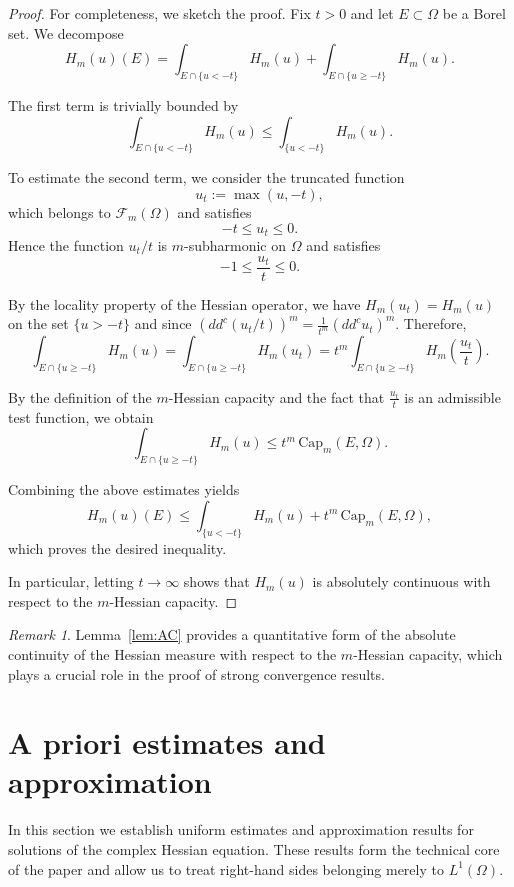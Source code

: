 \documentclass[11pt,reqno]{amsart}
\theoremstyle{definition}
\theoremstyle{remark}
\newtheorem{remark}[theorem]{Remark}
\newcommand{\ddc}{dd^c}
\begin{document}
	\begin{proof}
For completeness, we sketch the proof.
		Fix $t>0$ and let $E\subset\Omega$ be a Borel set.
		We decompose
		\[
		H_m(u)(E)
		=
		\int_{E\cap\{u<-t\}} H_m(u)
		+
		\int_{E\cap\{u\ge -t\}} H_m(u).
		\]
		
		The first term is trivially bounded by
		\[
		\int_{E\cap\{u<-t\}} H_m(u)
		\le
		\int_{\{u<-t\}} H_m(u).
		\]
		
		To estimate the second term, we consider the truncated function
		\[
		u_t := \max(u,-t),
		\]
		which belongs to $\mathcal F_m(\Omega)$ and satisfies
		\[
		- t \le u_t \le 0.
		\]
		Hence the function $u_t/t$ is $m$-subharmonic on $\Omega$ and satisfies
		\[
		-1 \le \frac{u_t}{t} \le 0.
		\]
		
		By the locality property of the Hessian operator,
		we have $H_m(u_t) = H_m(u)$ on the set $\{u>-t\}$ and since $(\ddc(u_t/t))^m = \frac{1}{t^m}(\ddc u_t)^m$. Therefore,
		\[
		\int_{E\cap\{u\ge -t\}} H_m(u)
		=
		\int_{E\cap\{u\ge -t\}} H_m(u_t)
		=
		t^m \int_{E\cap\{u\ge -t\}} H_m\!\left(\frac{u_t}{t}\right).
		\]
		
		By the definition of the $m$-Hessian capacity and the fact that
		$\frac{u_t}{t}$ is an admissible test function, we obtain
		\[
		\int_{E\cap\{u\ge -t\}} H_m(u)
		\le
		t^m \, \mathrm{Cap}_m(E,\Omega).
		\]
		
		Combining the above estimates yields
		\[
		H_m(u)(E)
		\le
		\int_{\{u<-t\}} H_m(u)
		+
		t^m \, \mathrm{Cap}_m(E,\Omega),
		\]
		which proves the desired inequality.
		
		In particular, letting $t\to\infty$ shows that $H_m(u)$ is absolutely
		continuous with respect to the $m$-Hessian capacity.
	\end{proof}
	\begin{remark}
		Lemma~\ref{lem:AC} provides a quantitative form of the absolute continuity
		of the Hessian measure with respect to the $m$-Hessian capacity,
		which plays a crucial role in the proof of strong convergence results.
	\end{remark}
	
	\section{A priori estimates and approximation}
	
	In this section we establish uniform estimates and approximation results for solutions of the complex Hessian equation.
	These results form the technical core of the paper and allow us to treat right-hand sides belonging merely to $L^1(\Omega)$.
	
\end{document}
